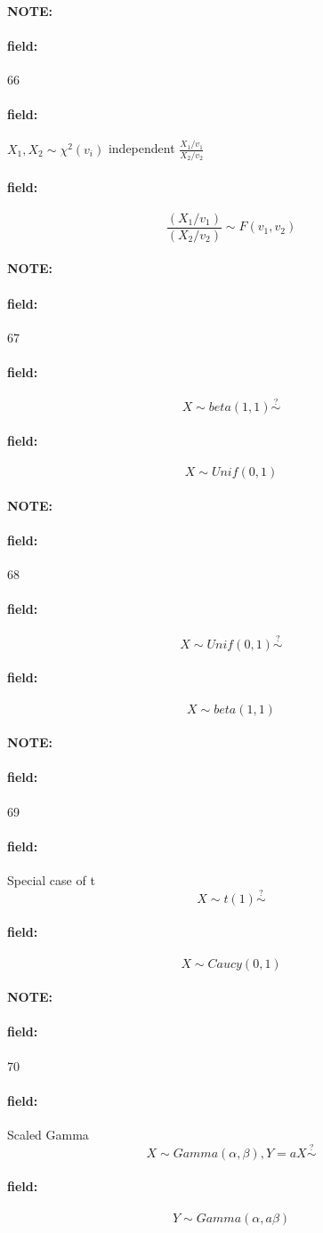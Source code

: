 \documentclass[12pt]{article}
\newenvironment{note}{\paragraph{NOTE:}}{}
\newenvironment{field}{\paragraph{field:}}{}
\begin{document}
\begin{note} \begin{field} \tiny 66 \end{field}
  \begin{field}
    $X_1, X_2 \sim \chi^2(v_i)$ independent
    $ \frac{X_1/v_1}{X_2/v_2}$
  \end{field}
  \begin{field}
    $$ \frac{(X_1/v_1)}{(X_2/v_2)} \sim F(v_1,v_2)$$
  \end{field}
\end{note}



\begin{note} \begin{field} \tiny 67 \end{field}
  \begin{field}
    $$ X \sim beta(1,1) \overset{?}{\sim}$$
  \end{field}
  \begin{field}
    $$ X \sim Unif(0,1)$$
  \end{field}
\end{note}

\begin{note} \begin{field} \tiny 68 \end{field}
  \begin{field}
    $$ X \sim Unif(0,1) \overset{?}{\sim}$$
  \end{field}
  \begin{field}
    $$ X \sim beta(1,1)$$
  \end{field}
\end{note}

\begin{note} \begin{field} \tiny 69 \end{field}
  \begin{field}
    Special case of t
    $$ X \sim t(1) \overset{?}{\sim}$$
  \end{field}
  \begin{field}
    $$ X \sim Caucy(0,1)$$
  \end{field}
\end{note}


\begin{note} \begin{field} \tiny 70 \end{field}
  \begin{field}
    Scaled Gamma
    $$X \sim Gamma(\alpha,\beta), Y = aX \overset{?}{\sim}$$
  \end{field}
  \begin{field}
    $$ Y \sim Gamma(\alpha,a\beta)$$
  \end{field}
\end{note}
\end{document}
